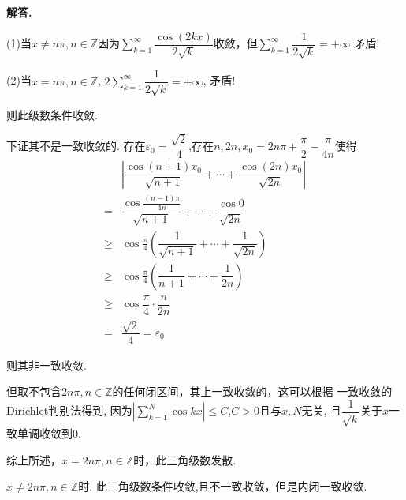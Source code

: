 \documentclass[12pt, a4paper, oneside]{ctexart}
\newenvironment{solution}{\par\noindent\textbf{解答. }}{\par}
\begin{document}
\begin{solution}
$$  $$
  \par
  (1)当$x\ne n\pi, n\in \mathbb{Z}$因为$\sum_{k=1}^{\infty}\dfrac{\cos(2kx)}{2\sqrt{k}}$收敛，但$\sum_{k=1}^{\infty}\dfrac{1}{2\sqrt{k}}=+\infty$
  矛盾!
  \par
  (2)当$x=n\pi,n\in\mathbb{Z}$, $2\sum_{k=1}^{\infty}\dfrac{1}{2\sqrt{k}}=+\infty$,
  矛盾!
  \par
  则此级数条件收敛.
  \par
  下证其不是一致收敛的.
  存在$\varepsilon_0=\dfrac{\sqrt{2}}{4}$,存在$n,2n,x_0=2n\pi+\dfrac{\pi}{2}-\dfrac{\pi}{4n}$使得
  $$
  \begin{aligned}
&\left|\dfrac{\cos(n+1)x_0}{\sqrt{n+1}}+\cdots+\dfrac{\cos(2n)x_0}{\sqrt{2n}}\right|\\
=&\dfrac{\cos\frac{(n-1)\pi}{4n}}{\sqrt{n+1}}+\cdots+\dfrac{\cos 0}{\sqrt{2n}}\\
\geqslant& \cos\frac{\pi}{4}\left(\dfrac{1}{\sqrt{n+1}}+\cdots+\dfrac{1}{\sqrt{2n}}\right)\\
\geqslant& \cos\frac{\pi}{4}\left(\dfrac{1}{n+1}+\cdots+\dfrac{1}{2n}\right)\\
\geqslant &\cos \dfrac{\pi}{4}\cdot \dfrac{n}{2n}\\
=&\dfrac{\sqrt{2}}{4}=\varepsilon_0
  \end{aligned}
  $$
  \par
  则其非一致收敛.
  \par
  但取不包含$2n\pi,n\in\mathbb{Z}$的任何闭区间，其上一致收敛的，这可以根据
  一致收敛的Dirichlet判别法得到, 因为$|\sum_{k=1}^{N}\cos kx|\leqslant C$,$C>0$且与$x,N$无关,
  且$\dfrac{1}{\sqrt{k}}$关于$x$一致单调收敛到$0$.
  \par
  综上所述，$x=2n\pi,n\in \mathbb{Z}$时，此三角级数发散.
  \par
  $x\ne 2n\pi, n\in \mathbb{Z}$时, 此三角级数条件收敛,且不一致收敛，但是内闭一致收敛.
\end{solution}
\end{document}
